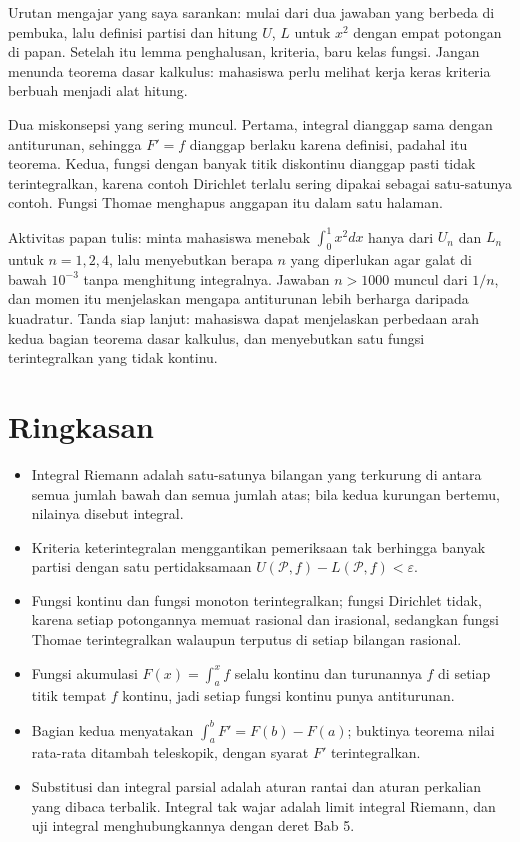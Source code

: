 \begin{untukdosen}
Urutan mengajar yang saya sarankan: mulai dari dua jawaban yang berbeda di pembuka, lalu
definisi partisi dan hitung $U$, $L$ untuk $x^2$ dengan empat potongan di papan. Setelah
itu lemma penghalusan, kriteria, baru kelas fungsi. Jangan menunda teorema dasar
kalkulus: mahasiswa perlu melihat kerja keras kriteria berbuah menjadi alat hitung.

Dua miskonsepsi yang sering muncul. Pertama, integral dianggap sama dengan antiturunan,
sehingga $F'=f$ dianggap berlaku karena definisi, padahal itu teorema. Kedua, fungsi
dengan banyak titik diskontinu dianggap pasti tidak terintegralkan, karena contoh
Dirichlet terlalu sering dipakai sebagai satu-satunya contoh. Fungsi Thomae menghapus
anggapan itu dalam satu halaman.

Aktivitas papan tulis: minta mahasiswa menebak $\int_0^1x^2dx$ hanya dari $U_n$ dan
$L_n$ untuk $n=1,2,4$, lalu menyebutkan berapa $n$ yang diperlukan agar galat di bawah
$10^{-3}$ tanpa menghitung integralnya. Jawaban $n>1000$ muncul dari $1/n$, dan momen
itu menjelaskan mengapa antiturunan lebih berharga daripada kuadratur. Tanda siap
lanjut: mahasiswa dapat menjelaskan perbedaan arah kedua bagian teorema dasar kalkulus,
dan menyebutkan satu fungsi terintegralkan yang tidak kontinu.
\end{untukdosen}

\section{Ringkasan}

\begin{ringkasan}
\begin{itemize}
\item Integral Riemann adalah satu-satunya bilangan yang terkurung di antara semua
      jumlah bawah dan semua jumlah atas; bila kedua kurungan bertemu, nilainya disebut
      integral.
\item Kriteria keterintegralan menggantikan pemeriksaan tak berhingga banyak partisi
      dengan satu pertidaksamaan $U(\mathcal{P},f)-L(\mathcal{P},f)<\varepsilon$.
\item Fungsi kontinu dan fungsi monoton terintegralkan; fungsi Dirichlet tidak, karena
      setiap potongannya memuat rasional dan irasional, sedangkan fungsi Thomae
      terintegralkan walaupun terputus di setiap bilangan rasional.
\item Fungsi akumulasi $F(x)=\int_a^xf$ selalu kontinu dan turunannya $f$ di setiap
      titik tempat $f$ kontinu, jadi setiap fungsi kontinu punya antiturunan.
\item Bagian kedua menyatakan $\int_a^bF'=F(b)-F(a)$; buktinya teorema nilai rata-rata
      ditambah teleskopik, dengan syarat $F'$ terintegralkan.
\item Substitusi dan integral parsial adalah aturan rantai dan aturan perkalian yang
      dibaca terbalik. Integral tak wajar adalah limit integral Riemann, dan uji
      integral menghubungkannya dengan deret Bab 5.
\end{itemize}
\end{ringkasan}

